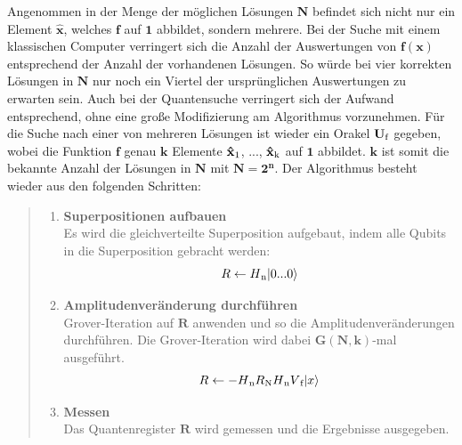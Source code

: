 Angenommen in der Menge der möglichen Lösungen $\mathbf{N}$ befindet sich nicht nur ein Element $\mathbf{\hat x}$, welches $\mathbf{f}$ auf $\mathbf{1}$ abbildet, sondern mehrere. 
Bei der Suche mit einem klassischen Computer verringert sich die Anzahl der Auswertungen von $\mathbf{f(x)}$ entsprechend der Anzahl der vorhandenen Lösungen. So würde bei vier korrekten Lösungen in $\mathbf{N}$ nur noch ein Viertel der ursprünglichen Auswertungen zu erwarten sein.
Auch bei der Quantensuche verringert sich der Aufwand entsprechend, ohne eine große Modifizierung am Algorithmus vorzunehmen.
Für die Suche nach einer von mehreren Lösungen ist wieder ein Orakel $\mathbf{U \textsubscript{f}}$ gegeben, wobei die Funktion $\mathbf{f}$ genau $\mathbf{k}$ Elemente $\mathbf{\hat x \textsubscript{1}}$, ..., $\mathbf{\hat x \textsubscript{k}}$ auf $\mathbf{1}$ abbildet. $\mathbf{k}$ ist somit die bekannte Anzahl der Lösungen in $\mathbf{N}$ mit $\mathbf{N = 2^n}$. 
Der Algorithmus besteht wieder aus den folgenden Schritten:
\begin{quote}
    \begin{enumerate}
        \item \textbf{Superpositionen aufbauen}
        \\
        Es wird die gleichverteilte Superposition aufgebaut, indem alle Qubits in die Superposition gebracht werden:
        \\
        \begin{equation}
            R \leftarrow H\textsubscript{n} |0 ... 0\rangle 
        \end{equation}
        \item \textbf{Amplitudenveränderung durchführen}
        \\
        Grover-Iteration auf $\mathbf{R}$ anwenden und so die Amplitudenveränderungen durchführen. Die Grover-Iteration wird dabei $\mathbf{G(N,k)}$-mal ausgeführt.
        \\
        \begin{equation}
            R \leftarrow -H\textsubscript{n} R\textsubscript{N} H\textsubscript{n} V\textsubscript{f} |x\rangle
        \end{equation}
        \item \textbf{Messen}
        \\
        Das Quantenregister $\mathbf{R}$ wird gemessen und die Ergebnisse ausgegeben.
    \end{enumerate}
\end{quote}

